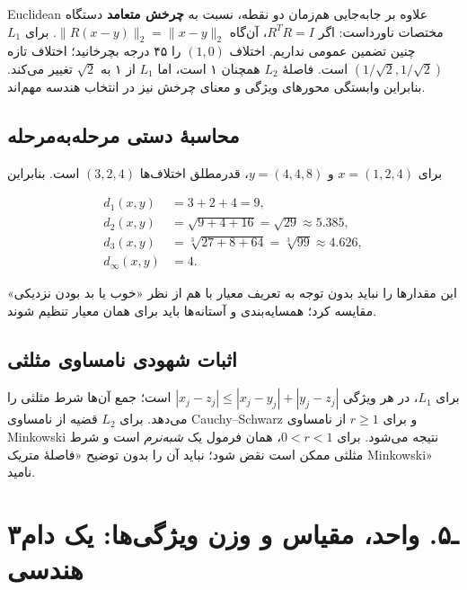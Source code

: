 \documentclass[12pt,a4paper,oneside]{book}
\begin{document}
Euclidean علاوه بر جابه‌جایی هم‌زمان دو نقطه، نسبت به \textbf{چرخش متعامد} دستگاه مختصات ناورداست: اگر \(R^TR=I\)، آن‌گاه \(\|R(x-y)\|_2=\|x-y\|_2\). برای \(L_1\) چنین تضمین عمومی نداریم. اختلاف \((1,0)\) را ۴۵ درجه بچرخانید؛ اختلاف تازه \(\left(1/\sqrt2,1/\sqrt2\right)\) است. فاصلهٔ \(L_2\) همچنان ۱ است، اما \(L_1\) از ۱ به \(\sqrt2\) تغییر می‌کند. بنابراین وابستگی محورهای ویژگی و معنای چرخش نیز در انتخاب هندسه مهم‌اند.

\subsection{محاسبهٔ دستی مرحله‌به‌مرحله}\label{ux645ux62dux627ux633ux628ux647-ux62fux633ux62aux6cc-ux645ux631ux62dux644ux647ux628ux647ux645ux631ux62dux644ux647}

برای \(x=(1,2,4)\) و \(y=(4,4,8)\)، قدرمطلق اختلاف‌ها \((3,2,4)\) است. بنابراین

\[
\begin{aligned}
d_1(x,y)&=3+2+4=9,\\
d_2(x,y)&=\sqrt{9+4+16}=\sqrt{29}\approx5.385,\\
d_3(x,y)&=\sqrt[3]{27+8+64}=\sqrt[3]{99}\approx4.626,\\
d_\infty(x,y)&=4.
\end{aligned}
\]

این مقدارها را نباید بدون توجه به تعریف معیار با هم از نظر «خوب یا بد بودن نزدیکی» مقایسه کرد؛ همسایه‌بندی و آستانه‌ها باید برای همان معیار تنظیم شوند.

\subsection{اثبات شهودی نامساوی مثلثی}\label{ux627ux62bux628ux627ux62a-ux634ux647ux648ux62fux6cc-ux646ux627ux645ux633ux627ux648ux6cc-ux645ux62bux644ux62bux6cc}

برای \(L_1\)، در هر ویژگی \(|x_j-z_j|\le|x_j-y_j|+|y_j-z_j|\) است؛ جمع آن‌ها شرط مثلثی را می‌دهد. برای \(L_2\) قضیه از نامساوی Cauchy--Schwarz و برای \(r\ge1\) از نامساوی Minkowski نتیجه می‌شود. برای \(0<r<1\)، همان فرمول یک \emph{شبه‌نرم} است و شرط مثلثی ممکن است نقض شود؛ نباید آن را بدون توضیح «فاصلهٔ متریک Minkowski» نامید.

\section{۳ـ۵. واحد، مقیاس و وزن ویژگی‌ها: یک دام هندسی}\label{ux640ux6f5.-ux648ux627ux62dux62f-ux645ux642ux6ccux627ux633-ux648-ux648ux632ux646-ux648ux6ccux698ux6afux6ccux647ux627-ux6ccux6a9-ux62fux627ux645-ux647ux646ux62fux633ux6cc}
\end{document}
